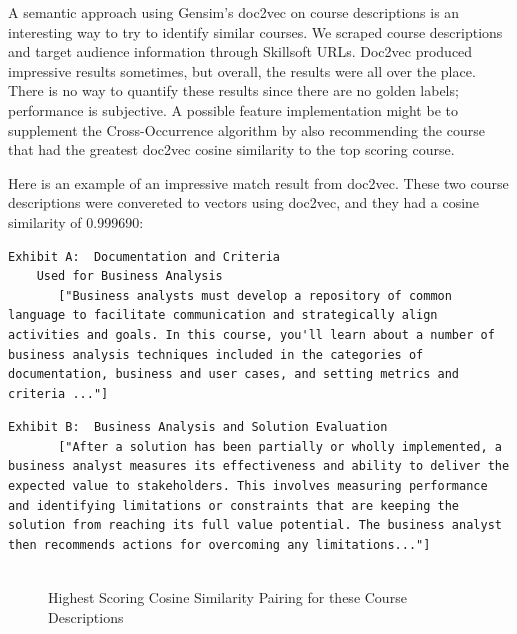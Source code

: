 \documentclass[12pt,journal]{IEEEtran}
\begin{document}
A semantic approach using Gensim's doc2vec \cite{rehurek_lrec} on course descriptions is an interesting way to try to identify similar courses.  We scraped course descriptions and target audience information through Skillsoft URLs.  Doc2vec produced impressive results sometimes, but overall, the results were all over the place.  There is no way to quantify these results since there are no golden labels; performance is subjective.  A possible feature implementation might be to supplement the Cross-Occurrence algorithm by also recommending the course that had the greatest doc2vec cosine similarity to the top scoring course.

Here is an example of an impressive match result from doc2vec.  These two course descriptions were convereted to vectors using doc2vec, and they had a cosine similarity of 0.999690:

\vspace{5mm}

\begin{lstlisting}[breaklines]
    Exhibit A:  Documentation and Criteria
    Used for Business Analysis
       ["Business analysts must develop a repository of common language to facilitate communication and strategically align activities and goals. In this course, you'll learn about a number of business analysis techniques included in the categories of documentation, business and user cases, and setting metrics and criteria ..."]
\end{lstlisting}

\vspace{1mm}

\begin{lstlisting}[breaklines]
    Exhibit B:  Business Analysis and Solution Evaluation   
       ["After a solution has been partially or wholly implemented, a business analyst measures its effectiveness and ability to deliver the expected value to stakeholders. This involves measuring performance and identifying limitations or constraints that are keeping the solution from reaching its full value potential. The business analyst then recommends actions for overcoming any limitations..."]
       
\end{lstlisting}

\begin{figure}[htbp]
\caption{Highest Scoring Cosine Similarity Pairing for these Course Descriptions}
\label{fig:doc2vec descriptions}
\end{figure}
\end{document}
